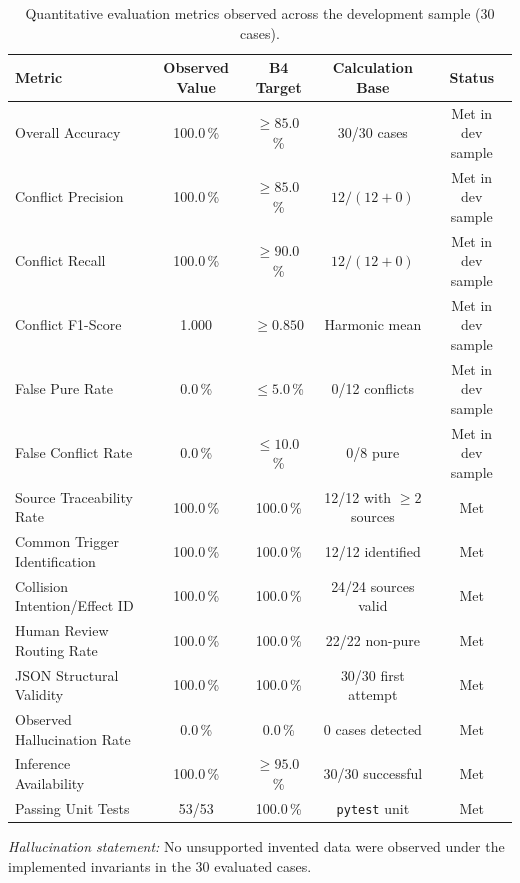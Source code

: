 \documentclass[11pt,a4paper]{article}
\begin{document}
\begin{table}[H]
\centering
\small
\caption{Quantitative evaluation metrics observed across the development sample (30 cases).}
\label{tab:metrics_b4_en}
\begin{tabularx}{\textwidth}{Xcccc}
\toprule
\textbf{Metric} & \textbf{Observed Value} & \textbf{B4 Target} & \textbf{Calculation Base} & \textbf{Status} \\
\midrule
Overall Accuracy & 100.0\,\% & $\ge 85.0$\,\% & 30/30 cases & Met in dev sample \\
Conflict Precision & 100.0\,\% & $\ge 85.0$\,\% & $12 / (12 + 0)$ & Met in dev sample \\
Conflict Recall & 100.0\,\% & $\ge 90.0$\,\% & $12 / (12 + 0)$ & Met in dev sample \\
Conflict F1-Score & 1.000 & $\ge 0.850$ & Harmonic mean & Met in dev sample \\
False Pure Rate & 0.0\,\% & $\le 5.0$\,\% & 0/12 conflicts & Met in dev sample \\
False Conflict Rate & 0.0\,\% & $\le 10.0$\,\% & 0/8 pure & Met in dev sample \\
Source Traceability Rate & 100.0\,\% & 100.0\,\% & 12/12 with $\ge 2$ sources & Met \\
Common Trigger Identification & 100.0\,\% & 100.0\,\% & 12/12 identified & Met \\
Collision Intention/Effect ID & 100.0\,\% & 100.0\,\% & 24/24 sources valid & Met \\
Human Review Routing Rate & 100.0\,\% & 100.0\,\% & 22/22 non-pure & Met \\
JSON Structural Validity & 100.0\,\% & 100.0\,\% & 30/30 first attempt & Met \\
Observed Hallucination Rate & 0.0\,\% & 0.0\,\% & 0 cases detected & Met \\
Inference Availability & 100.0\,\% & $\ge 95.0$\,\% & 30/30 successful & Met \\
Passing Unit Tests & 53/53 & 100.0\,\% & \texttt{pytest} unit & Met \\
\bottomrule
\end{tabularx}
\end{table}

\noindent\textit{Hallucination statement:} No unsupported invented data were observed under the implemented invariants in the 30 evaluated cases.

\end{document}
